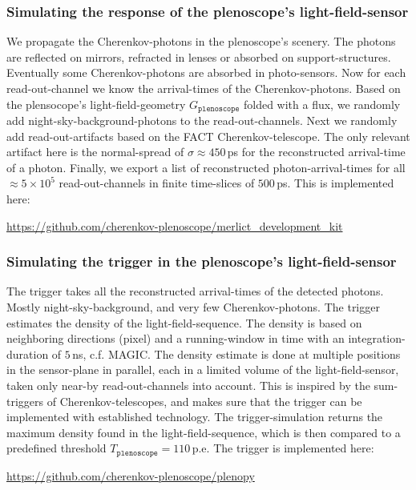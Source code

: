 \documentclass[a4paper,12pt,oneside]{article}
\begin{document}
\subsubsection{Simulating the response of the plenoscope's light-field-sensor}
\label{SubSecSimulatingLightFieldSensor}
%
We propagate the Cherenkov-photons in the plenoscope's scenery.
%
The photons are reflected on mirrors, refracted in lenses or absorbed on support-structures.
%
Eventually some Cherenkov-photons are absorbed in photo-sensors.
%
Now for each read-out-channel we know the arrival-times of the Cherenkov-photons.
%
Based on the plensocope's light-field-geometry $G_\texttt{plenoscope}$ folded with a flux, we randomly add night-sky-background-photons to the read-out-channels.
%
Next we randomly add read-out-artifacts based on the FACT Cherenkov-telescope.
%
The only relevant artifact here is the normal-spread of \mbox{$\sigma \approx 450\,$ps} for the reconstructed arrival-time of a photon.
%
Finally, we export a list of reconstructed photon-arrival-times for all \mbox{$\approx 5\times10^5$} read-out-channels in finite time-slices of \mbox{$500\,$ps}.
%
This is implemented here:
\begin{center}
\url{https://github.com/cherenkov-plenoscope/merlict_development_kit}
\end{center}
%
\subsubsection{Simulating the trigger in the plenoscope's light-field-sensor}
\label{SubSecSimulatingPlenoscopeTrigger}
%
The trigger takes all the reconstructed arrival-times of the detected photons.
%
Mostly night-sky-background, and very few Cherenkov-photons.
%
The trigger estimates the density of the light-field-sequence.
%
The density is based on neighboring directions (pixel) and a running-window in time with an integration-duration of $5\,$ns, c.f. MAGIC.
%
The density estimate is done at multiple positions in the sensor-plane in parallel, each in a limited volume of the light-field-sensor, taken only near-by read-out-channels into account.
%
This is inspired by the sum-triggers of Cherenkov-telescopes, and makes sure that the trigger can be implemented with established technology.
%
The trigger-simulation returns the maximum density found in the light-field-sequence, which is then compared to a predefined threshold $T_\texttt{plenoscope} = 110\,$p.e.
%
The trigger is implemented here:
%
\begin{center}
\url{https://github.com/cherenkov-plenoscope/plenopy}
\end{center}
%
\end{document}
